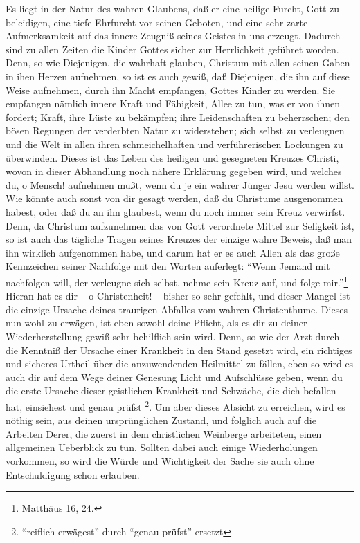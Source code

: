 Es liegt in der Natur des wahren Glaubens, daß er eine heilige Furcht, Gott zu
beleidigen, eine tiefe Ehrfurcht vor seinen Geboten, und eine sehr zarte
Aufmerksamkeit auf das innere Zeugniß seines Geistes in uns erzeugt. Dadurch
sind zu allen Zeiten die Kinder Gottes sicher zur Herrlichkeit geführet worden.
Denn, so wie Diejenigen, die wahrhaft glauben, Christum mit allen seinen Gaben
in ihen Herzen aufnehmen, so ist es auch gewiß, daß Diejenigen, die ihn auf
diese Weise aufnehmen, durch ihn Macht empfangen, Gottes Kinder zu werden. Sie
empfangen nämlich innere Kraft und Fähigkeit, Allee zu tun, was er von ihnen
fordert; Kraft, ihre Lüste zu bekämpfen; ihre Leidenschaften zu beherrschen; den
bösen Regungen der verderbten Natur zu widerstehen; sich selbst zu verleugnen
und die Welt in allen ihren schmeichelhaften und verführerischen Lockungen zu
überwinden. Dieses ist das Leben des heiligen und gesegneten Kreuzes Christi,
wovon in dieser Abhandlung noch nähere Erklärung gegeben wird, und welches du, o
Mensch! aufnehmen mußt, wenn du je ein wahrer Jünger Jesu werden willst. Wie
könnte auch sonst von dir gesagt werden, daß du Christume ausgenommen habest,
oder daß du an ihn glaubest, wenn du noch immer sein Kreuz verwirfst. Denn, da
Christum aufzunehmen das von Gott verordnete Mittel zur Seligkeit ist, so ist
auch das tägliche Tragen seines Kreuzes der einzige wahre Beweis, daß man ihn
wirklich aufgenommen habe, und darum hat er es auch Allen als das große
Kennzeichen seiner Nachfolge mit den Worten auferlegt: "`Wenn Jemand mit
nachfolgen will, der verleugne sich selbst, nehme sein Kreuz auf, und folge
mir."'\footnote{Matthäus 16, 24.} 
Hieran hat es dir -- o Christenheit! -- bisher so sehr gefehlt, und dieser
Mangel ist
die einzige Ursache deines traurigen Abfalles vom wahren Christenthume. Dieses
nun wohl zu erwägen, ist eben sowohl deine Pflicht, als es dir zu deiner
Wiederherstellung gewiß sehr behilflich sein wird. Denn, so wie der Arzt durch
die Kenntniß der Ursache einer Krankheit in den Stand gesetzt wird, ein
richtiges und sicheres Urtheil über die anzuwendenden Heilmittel zu fällen, eben
so wird es auch dir auf dem Wege deiner Genesung Licht und Aufschlüsse geben,
wenn du die erste Ursache dieser geistlichen Krankheit und Schwäche, die dich
befallen hat, einsiehest und genau prüfst \footnote{"`reiflich erwägest"' durch
"`genau prüfst"' ersetzt}. Um aber dieses Absicht zu
erreichen, wird es nöthig sein, aus deinen ursprünglichen Zustand, und folglich
auch auf die Arbeiten Derer, die zuerst in dem christlichen Weinberge
arbeiteten, einen allgemeinen Ueberblick zu tun. Sollten dabei auch einige
Wiederholungen vorkommen, so wird die Würde und Wichtigkeit der Sache sie auch
ohne Entschuldigung schon erlauben.

